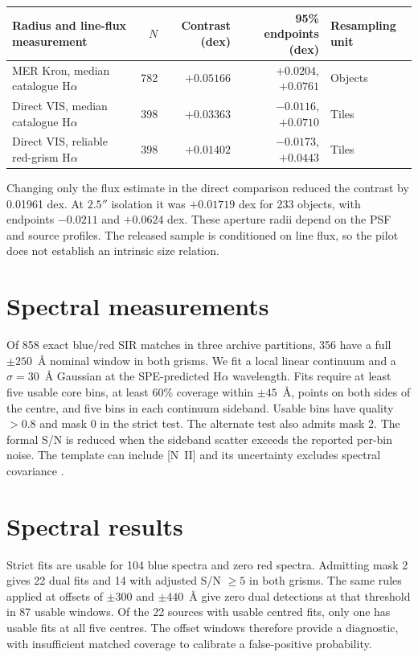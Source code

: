 \documentclass[10pt,a4paper]{article}
\begin{document}
\begin{minipage}{\linewidth}
\centering
{}
\label{tab:radii}
\small
\begin{tabular}{@{}lrrrl@{}}
\toprule
Radius and line-flux measurement & $N$ & Contrast (dex) & 95\% endpoints (dex) & Resampling unit \\
\midrule
MER Kron, median catalogue H$\alpha$ & 782 & $+0.05166$ & $+0.0204$, $+0.0761$ & Objects \\
Direct VIS, median catalogue H$\alpha$ & 398 & $+0.03363$ & $-0.0116$, $+0.0710$ & Tiles \\
Direct VIS, reliable red-grism H$\alpha$ & 398 & $+0.01402$ & $-0.0173$, $+0.0443$ & Tiles \\
\bottomrule
\end{tabular}
\end{minipage}

Changing only the flux estimate in the direct comparison reduced the contrast by 0.01961 dex. At $2.5''$ isolation it was $+0.01719$ dex for 233 objects, with endpoints $-0.0211$ and $+0.0624$ dex. These aperture radii depend on the PSF and source profiles. The released sample is conditioned on line flux, so the pilot does not establish an intrinsic size relation.

\section{Spectral measurements}
Of 858 exact blue/red SIR matches in three archive partitions, 356 have a full $\pm250$~\AA{} nominal window in both grisms. We fit a local linear continuum and a $\sigma=30$~\AA{} Gaussian at the SPE-predicted H$\alpha$ wavelength. Fits require at least five usable core bins, at least 60\% coverage within $\pm45$~\AA, points on both sides of the centre, and five bins in each continuum sideband. Usable bins have quality $>0.8$ and mask 0 in the strict test. The alternate test also admits mask 2. The formal S/N is reduced when the sideband scatter exceeds the reported per-bin noise. The template can include [N~II] and its uncertainty excludes spectral covariance \citep{fumana2026,gabarra2026}.

\newpage
\section{Spectral results}
Strict fits are usable for 104 blue spectra and zero red spectra. Admitting mask 2 gives 22 dual fits and 14 with adjusted S/N $\geq5$ in both grisms. The same rules applied at offsets of $\pm300$ and $\pm440$~\AA{} give zero dual detections at that threshold in 87 usable windows. Of the 22 sources with usable centred fits, only one has usable fits at all five centres. The offset windows therefore provide a diagnostic, with insufficient matched coverage to calibrate a false-positive probability.
\end{document}
